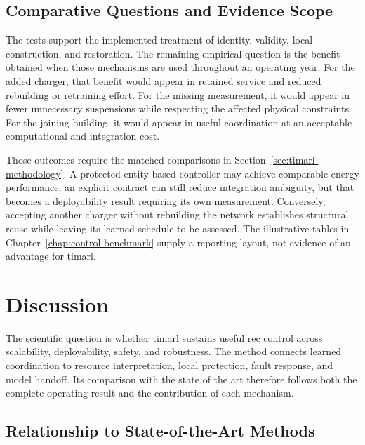 \subsection{Comparative Questions and Evidence Scope}
\label{sec:timarl-results-reconfiguration}
\label{sec:timarl-results-health}
\label{sec:timarl-results-coordination}
\label{sec:timarl-results-scale}
\label{sec:timarl-results-ablations}

The tests support the implemented treatment of identity, validity, local construction, and restoration. The remaining empirical question is the benefit obtained when those mechanisms are used throughout an operating year. For the added charger, that benefit would appear in retained service and reduced rebuilding or retraining effort. For the missing measurement, it would appear in fewer unnecessary suspensions while respecting the affected physical constraints. For the joining building, it would appear in useful coordination at an acceptable computational and integration cost.

Those outcomes require the matched comparisons in Section~\ref{sec:timarl-methodology}. A protected entity-based controller may achieve comparable energy performance; an explicit contract can still reduce integration ambiguity, but that becomes a deployability result requiring its own measurement. Conversely, accepting another charger without rebuilding the network establishes structural reuse while leaving its learned schedule to be assessed. The illustrative tables in Chapter~\ref{chap:control-benchmark} supply a reporting layout, not evidence of an advantage for \gls{timarl}.

\section{Discussion}
\label{sec:timarl-discussion}

The scientific question is whether \gls{timarl} sustains useful \gls{rec} control across scalability, deployability, safety, and robustness. The method connects learned coordination to resource interpretation, local protection, fault response, and model handoff. Its comparison with the state of the art therefore follows both the complete operating result and the contribution of each mechanism.

\subsection{Relationship to State-of-the-Art Methods}
\label{sec:timarl-neighbour-comparison}


